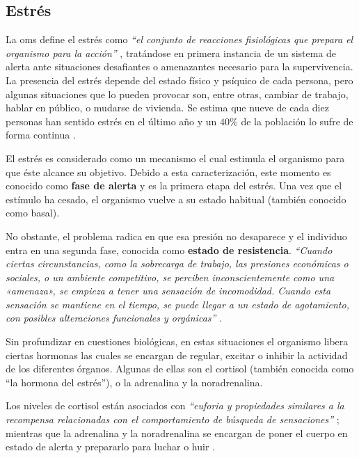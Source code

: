     \subsection{Estrés}
        La \gls{oms} define el estrés como \textit{``el conjunto de reacciones fisiológicas que prepara el organismo para la acción''} \cite{torrades_estres_2007}, tratándose en primera instancia de un sistema de alerta ante situaciones desafiantes o amenazantes necesario para la supervivencia. La presencia del estrés depende del estado físico y psíquico de cada persona, pero algunas situaciones que lo pueden provocar son, entre otras, cambiar de trabajo, hablar en público, o mudarse de vivienda. Se estima que nueve de cada diez personas han sentido estrés en el último año y un $40\%$ de la población lo sufre de forma continua \cite{nogera_mas_estres_2024}.
        
        El estrés es considerado como un mecanismo el cual estimula el organismo para que éste alcance su objetivo. Debido a esta caracterización, este momento es conocido como \textbf{fase de alerta} y es la primera etapa del estrés. Una vez que el estímulo ha cesado, el organismo vuelve a su estado habitual (también conocido como basal).
        
        No obstante, el problema radica en que esa presión no desaparece y el individuo entra en una segunda fase, conocida como \textbf{estado de resistencia}. \textit{``Cuando ciertas circunstancias, como la sobrecarga de trabajo, las presiones económicas o sociales, o un ambiente competitivo, se perciben inconscientemente como una «amenaza», se empieza a tener una sensación de incomodidad. Cuando esta sensación se mantiene en el tiempo, se puede llegar a un estado de agotamiento, con posibles alteraciones funcionales y orgánicas''} \cite{torrades_estres_2007}.

        Sin profundizar en cuestiones biológicas, en estas situaciones el organismo libera ciertas hormonas las cuales se encargan de regular, excitar o inhibir la actividad de los diferentes órganos. Algunas de ellas son el cortisol (también conocida como ``la hormona del estrés''), o la adrenalina y la noradrenalina. 
        
        Los niveles de cortisol están asociados con \textit{``euforia y propiedades similares a la recompensa relacionadas con el comportamiento de búsqueda de sensaciones''} \cite{currid_efectos_2019}; mientras que la adrenalina y la noradrenalina se encargan de poner el cuerpo en estado de alerta y prepararlo para luchar o huir \cite{torrades_estres_2007}.

